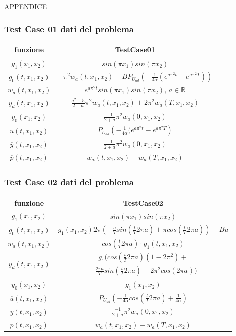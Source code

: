 \documentclass{beamer}
\theoremstyle{definition}
\theoremstyle{remark}
\theoremstyle{plain}
\theoremstyle{definition}
\begin{document}
\begin{frame}
APPENDICE
\end{frame}

\begin{frame}
\frametitle{Test Case 01 dati del problema}
\begin{tabular}{|c|c|}
\hline
\textbf{funzione} & \textbf{TestCase01}\\
\hline
$g_1(x_1,x_2)$ & $sin({\pi}x_1)sin({\pi}x_2)$\\
\hline
$g_0(t,x_1,x_2)$ & $ -{\pi}^2w_a(t,x_1,x_2) - BP_{U_{ad}} \left( -\frac{1}{4\alpha} (e^{a{\pi}^2t} - e^{a{\pi}^2T}) \right)$ \\
\hline
$w_a(t,x_1,x_2)$ & $e^{a{\pi}^2t}sin({\pi}x_1)sin({\pi}x_2) \text{, } a \in \mathbb{R}$ \\
\hline
$y_d(t,x_1,x_2)$ & $\frac{a^2 - 5}{2 + a}{\pi}^2w_a(t,x_1,x_2) + 2{\pi}^2w_a(T,x_1,x_2)$ \\
\hline
$y_0(x_1,x_2)$ & $\frac{- 1}{2 + a}{\pi}^2w_a(0,x_1,x_2)$ \\
\hline
$\overline{u}(t,x_1,x_2)$ & $P_{U_{ad}} \left( -\frac{1}{4\alpha}(e^{a{\pi}^2t}-e^{a{\pi}^2T} \right)$ \\
\hline
$\overline{y}(t,x_1,x_2)$ & $\frac{- 1}{2 + a}{\pi}^2w_a(0,x_1,x_2)$ \\
\hline
$\overline{p}(t,x_1,x_2)$ & $w_a(t,x_1,x_2) - w_a(T,x_1,x_2)$ \\
\hline
\end{tabular}

\end{frame}

\begin{frame}
\frametitle{Test Case 02 dati del problema}
\begin{tabular}{|c|c|}
\hline
\textbf{funzione} & \textbf{TestCase02}\\
\hline
$g_1(x_1,x_2)$ & $sin({\pi}x_1)sin({\pi}x_2)$\\
\hline
$g_0(t,x_1,x_2)$ & $g_1(x_1,x_2) 2\pi \left( -\frac{a}{T}sin\left( \frac{t}{T}2{\pi}a \right) + \pi cos\left( \frac{t}{T}2{\pi}a \right) \right) - B\overline{u}$ \\
\hline
$w_a(t,x_1,x_2)$ & $cos \left( \frac{t}{T}2{\pi}a \right) \cdot g_1(t,x_1,x_2)$ \\
\hline
\multirow{2}{*}{$y_d(t,x_1,x_2)$} & $g_1 ( cos\left( \frac{t}{T}2{\pi}a \right) (1-2{\pi}^2)+$ \\  
 & $-\frac{2{\pi}a}{T}sin\left( \frac{t}{T}2{\pi}a \right) +2{\pi}^2cos(2{\pi}a) )$ \\
\hline
$y_0(x_1,x_2)$ & $g_1(x_1,x_2)$ \\
\hline
$\overline{u}(t,x_1,x_2)$ & $P_{U_{ad}} \left( -\frac{1}{4\alpha}cos \left( \frac{t}{T}2{\pi}a \right) +\frac{1}{4\alpha} \right)$ \\
\hline
$\overline{y}(t,x_1,x_2)$ & $\frac{- 1}{2 + a}{\pi}^2w_a(0,x_1,x_2)$ \\
\hline
$\overline{p}(t,x_1,x_2)$ & $w_a(t,x_1,x_2) - w_a(T,x_1,x_2)$ \\
\hline
\end{tabular}

\end{frame}
\end{document}
